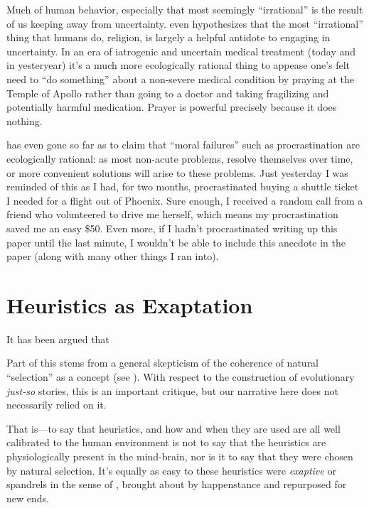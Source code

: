 \documentclass{article}
\begin{document}
Much of human behavior, especially that most seemingly ``irrational'' is the result of us keeping away from uncertainty.
\textcite{taleb12} even hypothesizes that the most ``irrational'' thing that humans do, religion, is largely a helpful antidote to engaging in uncertainty.
In an era of iatrogenic and uncertain medical treatment (today and in yesteryear) it's a much more ecologically rational thing to appease one's felt need to ``do something'' about a non-severe medical condition by praying at the Temple of Apollo rather than going to a doctor and taking fragilizing and potentially harmful medication.
Prayer is powerful precisely because it does nothing.


\textcite{taleb15} has even gone so far as to claim that ``moral failures'' such as procrastination are ecologically rational: as most non-acute problems, resolve themselves over time, or more convenient solutions will arise to these problems.
Just yesterday I was reminded of this as I had, for two months, procrastinated buying a shuttle ticket I needed for a flight out of Phoenix.
Sure enough, I received a random call from a friend who volunteered to drive me herself, which means my procrastination saved me an easy \$50.
Even more, if I hadn't procrastinated writing up this paper until the last minute, I wouldn't be able to include this anecdote in the paper (along with many other things I ran into).


\section{Heuristics as Exaptation}


It has been argued \parencite{massimo89,gould91} that

Part of this stems from a general skepticism of the coherence of natural ``selection'' as a concept (see \textcite{fodor10}).
With respect to the construction of evolutionary \textit{just-so} stories, this is an important critique, but our narrative here does not necessarily relied on it.

That is---to say that heuristics, and how and when they are used are all well calibrated to the human environment is not to say that the heuristics are physiologically present in the mind-brain, nor is it to say that they were chosen by natural selection.
It's equally as easy to these heuristics were \emph{exaptive} \parencite{buss98} or spandrels in the sense of \textcite{gould79}, brought about by happenstance and repurposed for new ends.
\end{document}
